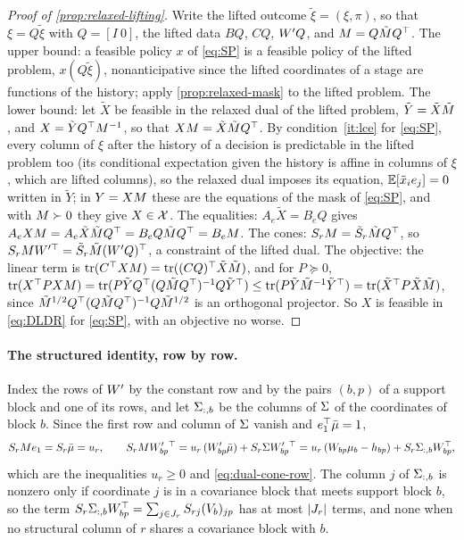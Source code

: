 \begin{proof}[Proof of \cref{prop:relaxed-lifting}]
Write the lifted outcome $\tilde\xi = (\xi, \pi)$, so that $\xi = Q\tilde\xi$ with $Q = [I\ 0]$, the lifted data $B Q$, $CQ$, $W' Q$, and $M = Q\tilde{M} Q^\top$.
The upper bound: a feasible policy $x$ of \eqref{eq:SP} is a feasible policy of the lifted problem, $x(Q\tilde\xi)$, nonanticipative since the lifted coordinates of a stage are functions of the history; apply \cref{prop:relaxed-mask} to the lifted problem.
The lower bound: let $\tilde X$ be feasible in the relaxed dual of the lifted problem, $\tilde Y = \tilde X\tilde{M}$, and $X = \tilde Y Q^\top M^{-1}$, so that $XM = \tilde X\tilde{M} Q^\top$.
By condition~\ref{it:lce} for \eqref{eq:SP}, every column of $\xi$ after the history of a decision is predictable in the lifted problem too (its conditional expectation given the history is affine in columns of $\xi$, which are lifted columns), so the relaxed dual imposes its equation, $\mathbb{E}[\tilde x_i e_j] = 0$ written in $\tilde Y$; in $Y = XM$ these are the equations of the mask of \eqref{eq:SP}, and with $M \succ 0$ they give $X \in \mathcal{X}$.
The equalities: $A_e\tilde X = B_eQ$ gives $A_eXM = A_e\tilde X\tilde{M} Q^\top = B_eQ\tilde{M} Q^\top = B_eM$.
The cones: $S_rM = \tilde S_r\tilde{M} Q^\top$, so $S_rMW'^\top = \tilde S_r\tilde{M}(W' Q)^\top$, a constraint of the lifted dual.
The objective: the linear term is $\operatorname{tr}(C^\top XM) = \operatorname{tr}((CQ)^\top\tilde X\tilde{M})$, and for $P \succeq 0$,
$\operatorname{tr}(X^\top PXM) = \operatorname{tr}(P\tilde Y Q^\top(Q\tilde{M} Q^\top)^{-1}Q\tilde Y^\top) \le \operatorname{tr}(P\tilde Y\tilde{M}^{-1}\tilde Y^\top) = \operatorname{tr}(\tilde X^\top P\tilde X\tilde{M})$,
since $\tilde{M}^{1/2}Q^\top(Q\tilde{M} Q^\top)^{-1}Q\tilde{M}^{1/2}$ is an orthogonal projector.
So $X$ is feasible in \eqref{eq:DLDR} for \eqref{eq:SP}, with an objective no worse.
\end{proof}

\paragraph{The structured identity, row by row.}
Index the rows of $W'$ by the constant row and by the pairs $(b, p)$ of a support block and one of its rows, and let $\Sigma_{:,b}$ be the columns of $\Sigma$ of the coordinates of block $b$.
Since the first row and column of $\Sigma$ vanish and $e_1^\top\bar\mu = 1$,
\[
S_rMe_1 = S_r\bar\mu = u_r,
\qquad
S_rMW'_{bp}{}^\top = u_r\,(W'_{bp}\bar\mu) + S_r\Sigma W'_{bp}{}^\top = u_r\,(W_{bp}\mu_b - h_{bp}) + S_r\Sigma_{:,b}W_{bp}^\top,
\]
which are the inequalities $u_r \ge 0$ and \eqref{eq:dual-cone-row}.
The column $j$ of $\Sigma_{:,b}$ is nonzero only if coordinate $j$ is in a covariance block that meets support block $b$,
so the term $S_r\Sigma_{:,b}W_{bp}^\top = \sum_{j\in J_r} S_{rj}(V_b)_{jp}$ has at most $\lvert J_r \rvert$ terms, and none when no structural column of $r$ shares a covariance block with $b$.

